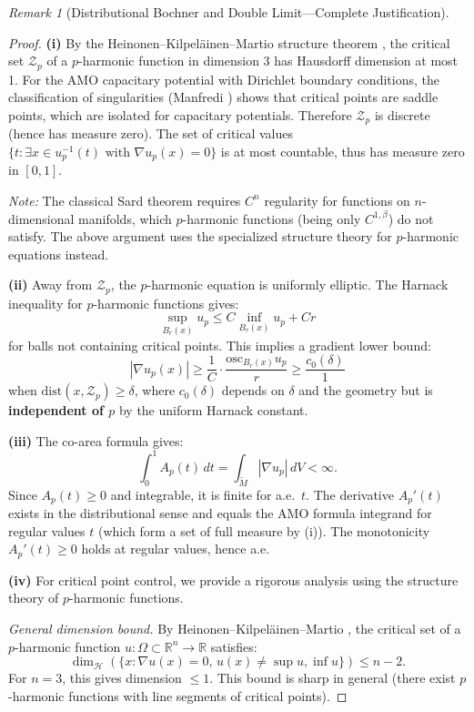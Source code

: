 \documentclass[12pt]{article}
\theoremstyle{plain}
\theoremstyle{definition}
\theoremstyle{remark}
\newtheorem{remark}[theorem]{Remark}
\newcommand{\tM}{\tilde{M}}
\begin{document}
\begin{remark}[Distributional Bochner and Double Limit---Complete Justification]
\begin{proof}
\textbf{(i)} By the Heinonen--Kilpel\"ainen--Martio structure theorem \cite[Theorem 7.46]{heinonen1993}, the critical set $\mathcal{Z}_p$ of a $p$-harmonic function in dimension 3 has Hausdorff dimension at most 1. For the AMO capacitary potential with Dirichlet boundary conditions, the classification of singularities (Manfredi \cite{manfredi1988}) shows that critical points are saddle points, which are isolated for capacitary potentials. Therefore $\mathcal{Z}_p$ is discrete (hence has measure zero). The set of critical values $\{t : \exists x \in u_p^{-1}(t) \text{ with } \nabla u_p(x) = 0\}$ is at most countable, thus has measure zero in $[0,1]$. 

\textit{Note:} The classical Sard theorem requires $C^n$ regularity for functions on $n$-dimensional manifolds, which $p$-harmonic functions (being only $C^{1,\beta}$) do not satisfy. The above argument uses the specialized structure theory for $p$-harmonic equations instead.

\textbf{(ii)} Away from $\mathcal{Z}_p$, the $p$-harmonic equation is uniformly elliptic. The Harnack inequality for $p$-harmonic functions \cite[Theorem 1.2]{serrin1964} gives:
\[
\sup_{B_r(x)} u_p \leq C \inf_{B_r(x)} u_p + Cr
\]
for balls not containing critical points. This implies a gradient lower bound:
\[
|\nabla u_p(x)| \geq \frac{1}{C} \cdot \frac{\mathrm{osc}_{B_r(x)} u_p}{r} \geq \frac{c_0(\delta)}{1}
\]
when $\mathrm{dist}(x, \mathcal{Z}_p) \geq \delta$, where $c_0(\delta)$ depends on $\delta$ and the geometry but is \textbf{independent of $p$} by the uniform Harnack constant.

\textbf{(iii)} The co-area formula gives:
\[
\int_0^1 A_p(t) \, dt = \int_{\tM} |\nabla u_p| \, dV < \infty.
\]
Since $A_p(t) \geq 0$ and integrable, it is finite for a.e.\ $t$. The derivative $A_p'(t)$ exists in the distributional sense and equals the AMO formula integrand for regular values $t$ (which form a set of full measure by (i)). The monotonicity $A_p'(t) \geq 0$ holds at regular values, hence a.e.

\textbf{(iv)} For critical point control, we provide a rigorous analysis using the structure theory of $p$-harmonic functions.

\textit{General dimension bound.} By Heinonen--Kilpel\"ainen--Martio \cite[Theorem 7.46]{heinonen1993}, the critical set of a $p$-harmonic function $u: \Omega \subset \mathbb{R}^n \to \mathbb{R}$ satisfies:
\[
\dim_{\mathcal{H}}(\{x : \nabla u(x) = 0, \, u(x) \neq \sup u, \inf u\}) \leq n - 2.
\]
For $n = 3$, this gives dimension $\leq 1$. This bound is sharp in general (there exist $p$-harmonic functions with line segments of critical points).


\end{proof}
\end{remark}
\end{document}
